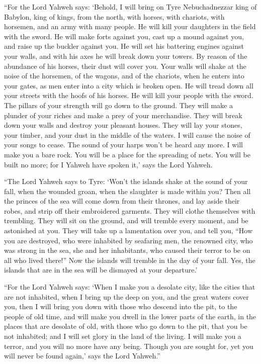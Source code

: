  ``For the Lord Yahweh says: `Behold, I will bring on Tyre
Nebuchadnezzar king of Babylon, king of kings, from the north, with
horses, with chariots, with horsemen, and an army with many people.
 He will kill your daughters in the field with the sword. He
will make forts against you, cast up a mound against you, and raise up
the buckler against you.  He will set his battering engines
against your walls, and with his axes he will break down your towers.
 By reason of the abundance of his horses, their dust will
cover you. Your walls will shake at the noise of the horsemen, of the
wagons, and of the chariots, when he enters into your gates, as men
enter into a city which is broken open.  He will tread down
all your streets with the hoofs of his horses. He will kill your people
with the sword. The pillars of your strength will go down to the ground.
 They will make a plunder of your riches and make a prey of
your merchandise. They will break down your walls and destroy your
pleasant houses. They will lay your stones, your timber, and your dust
in the middle of the waters.  I will cause the noise of
your songs to cease. The sound of your harps won't be heard any more.
 I will make you a bare rock. You will be a place for the
spreading of nets. You will be built no more; for I Yahweh have spoken
it,' says the Lord Yahweh.

 ``The Lord Yahweh says to Tyre: `Won't the islands shake
at the sound of your fall, when the wounded groan, when the slaughter is
made within you?  Then all the princes of the sea will come
down from their thrones, and lay aside their robes, and strip off their
embroidered garments. They will clothe themselves with trembling. They
will sit on the ground, and will tremble every moment, and be astonished
at you.  They will take up a lamentation over you, and tell
you, ``How you are destroyed, who were inhabited by seafaring men, the
renowned city, who was strong in the sea, she and her inhabitants, who
caused their terror to be on all who lived there!''  Now
the islands will tremble in the day of your fall. Yes, the islands that
are in the sea will be dismayed at your departure.'

 ``For the Lord Yahweh says: `When I make you a desolate
city, like the cities that are not inhabited, when I bring up the deep
on you, and the great waters cover you,  then I will bring
you down with those who descend into the pit, to the people of old time,
and will make you dwell in the lower parts of the earth, in the places
that are desolate of old, with those who go down to the pit, that you be
not inhabited; and I will set glory in the land of the living.
 I will make you a terror, and you will no more have any
being. Though you are sought for, yet you will never be found again,'
says the Lord Yahweh.''

